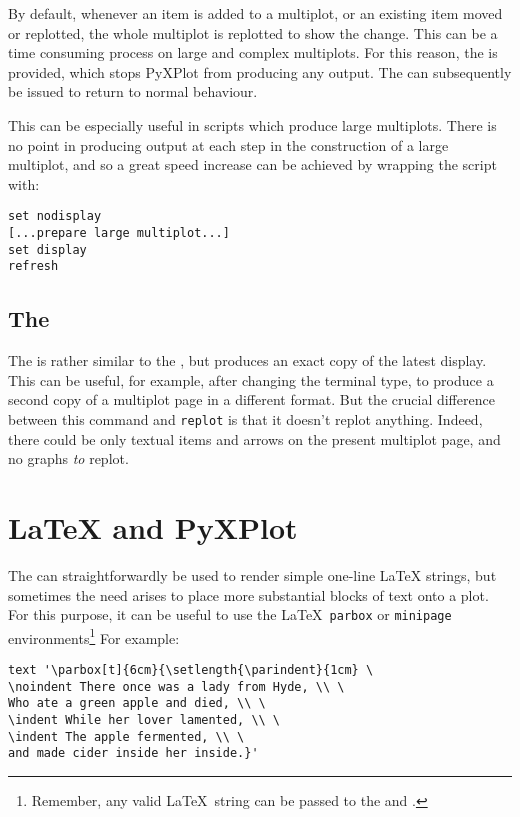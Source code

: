 By default, whenever an item is added to a multiplot, or an existing item moved
or replotted, the whole multiplot is replotted to show the change. This can be
a time consuming process on large and complex multiplots. For this reason, the
 is provided, which stops PyXPlot from producing any
output. The  can subsequently be issued to return to
normal behaviour.

This can be especially useful in scripts which produce large multiplots. There
is no point in producing output at each step in the construction of a large
multiplot, and so a great speed increase can be achieved by wrapping the script
with:

\begin{verbatim} 
set nodisplay
[...prepare large multiplot...]
set display
refresh
\end{verbatim}

\subsection{The }

 The  is rather similar to the
, but produces an exact copy of the latest display. This can be
useful, for example, after changing the terminal type, to produce a second copy
of a multiplot page in a different format. But the crucial difference between
this command and {\tt replot} is that it doesn't replot anything. Indeed, there
could be only textual items and arrows on the present multiplot page, and no
graphs {\it to} replot.

\section{LaTeX and PyXPlot}

The  can straightforwardly be used to render simple one-line
\LaTeX{} strings, but sometimes the need arises to place more
substantial blocks of text onto a plot. For this purpose, it can be useful to
use the \LaTeX\ {\tt parbox} or {\tt minipage} environments\footnote{Remember,
any valid \LaTeX\ string can be passed to the  and .} For example:

\begin{verbatim} 
text '\parbox[t]{6cm}{\setlength{\parindent}{1cm} \
\noindent There once was a lady from Hyde, \\ \
Who ate a green apple and died, \\ \
\indent While her lover lamented, \\ \
\indent The apple fermented, \\ \
and made cider inside her inside.}'
\end{verbatim}

